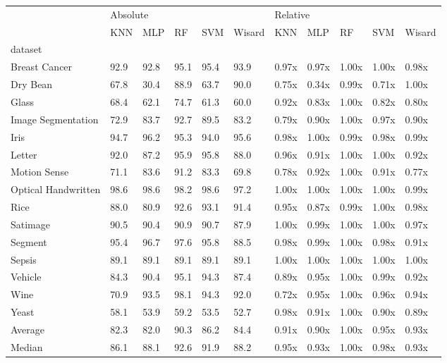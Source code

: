 \begin{tabular}{lllllllllll}
\toprule
{} & \multicolumn{5}{l}{Absolute} & \multicolumn{5}{l}{Relative} \\
{} &      KNN &   MLP &    RF &   SVM & Wisard &      KNN &    MLP &     RF &    SVM & Wisard \\
dataset             &          &       &       &       &        &          &        &        &        &        \\
\midrule
Breast Cancer       &     92.9 &  92.8 &  95.1 &  95.4 &   93.9 &    0.97x &  0.97x &  1.00x &  1.00x &  0.98x \\
Dry Bean            &     67.8 &  30.4 &  88.9 &  63.7 &   90.0 &    0.75x &  0.34x &  0.99x &  0.71x &  1.00x \\
Glass               &     68.4 &  62.1 &  74.7 &  61.3 &   60.0 &    0.92x &  0.83x &  1.00x &  0.82x &  0.80x \\
Image Segmentation  &     72.9 &  83.7 &  92.7 &  89.5 &   83.2 &    0.79x &  0.90x &  1.00x &  0.97x &  0.90x \\
Iris                &     94.7 &  96.2 &  95.3 &  94.0 &   95.6 &    0.98x &  1.00x &  0.99x &  0.98x &  0.99x \\
Letter              &     92.0 &  87.2 &  95.9 &  95.8 &   88.0 &    0.96x &  0.91x &  1.00x &  1.00x &  0.92x \\
Motion Sense        &     71.1 &  83.6 &  91.2 &  83.3 &   69.8 &    0.78x &  0.92x &  1.00x &  0.91x &  0.77x \\
Optical Handwritten &     98.6 &  98.6 &  98.2 &  98.6 &   97.2 &    1.00x &  1.00x &  1.00x &  1.00x &  0.99x \\
Rice                &     88.0 &  80.9 &  92.6 &  93.1 &   91.4 &    0.95x &  0.87x &  0.99x &  1.00x &  0.98x \\
Satimage            &     90.5 &  90.4 &  90.9 &  90.7 &   87.9 &    1.00x &  0.99x &  1.00x &  1.00x &  0.97x \\
Segment             &     95.4 &  96.7 &  97.6 &  95.8 &   88.5 &    0.98x &  0.99x &  1.00x &  0.98x &  0.91x \\
Sepsis              &     89.1 &  89.1 &  89.1 &  89.1 &   89.1 &    1.00x &  1.00x &  1.00x &  1.00x &  1.00x \\
Vehicle             &     84.3 &  90.4 &  95.1 &  94.3 &   87.4 &    0.89x &  0.95x &  1.00x &  0.99x &  0.92x \\
Wine                &     70.9 &  93.5 &  98.1 &  94.3 &   92.0 &    0.72x &  0.95x &  1.00x &  0.96x &  0.94x \\
Yeast               &     58.1 &  53.9 &  59.2 &  53.5 &   52.7 &    0.98x &  0.91x &  1.00x &  0.90x &  0.89x \\
Average             &     82.3 &  82.0 &  90.3 &  86.2 &   84.4 &    0.91x &  0.90x &  1.00x &  0.95x &  0.93x \\
Median              &     86.1 &  88.1 &  92.6 &  91.9 &   88.2 &    0.95x &  0.93x &  1.00x &  0.98x &  0.93x \\
\bottomrule
\end{tabular}
